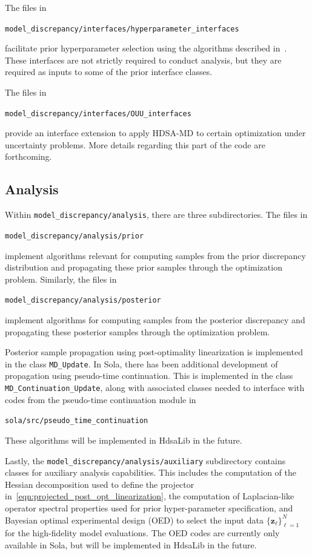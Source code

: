 \documentclass[11pt]{article}
\newcommand{\z}{\bm{z}}
\newcommand{\0}{\bm{0}}
\begin{document}
The files in 
\begin{center}\texttt{model\_discrepancy/interfaces/hyperparameter\_interfaces}\end{center}
 facilitate prior hyperparameter selection using the algorithms described in~\cite{hart2025hdsaprior}. These interfaces are not strictly required to conduct analysis, but they are required as inputs to some of the prior interface classes.

The files in 
\begin{center}\texttt{model\_discrepancy/interfaces/OUU\_interfaces}\end{center}
 provide an interface extension to apply HDSA-MD to certain optimization under uncertainty problems. More details regarding this part of the code are forthcoming. 

\subsection*{Analysis}
Within \texttt{model\_discrepancy/analysis}, there are three subdirectories. The files in 
\begin{center}\texttt{model\_discrepancy/analysis/prior}\end{center}

implement algorithms relevant for computing samples from the prior discrepancy distribution and propagating these prior samples through the optimization problem. Similarly, the files in
\begin{center}\texttt{model\_discrepancy/analysis/posterior}\end{center}

implement algorithms for computing samples from the posterior discrepancy and propagating these posterior samples through the optimization problem. 

Posterior sample propagation using post-optimality linearization is implemented in the class \texttt{MD\_Update}. In Sola, there has been additional development of propagation using pseudo-time continuation. This is implemented in the class \texttt{MD\_Continuation\_Update}, along with associated classes needed to interface with codes from the pseudo-time continuation module in 
\begin{center}\texttt{sola/src/pseudo\_time\_continuation}\end{center}

These algorithms will be implemented in HdsaLib in the future.

Lastly, the \texttt{model\_discrepancy/analysis/auxiliary} subdirectory contains classes for auxiliary analysis capabilities. This includes the computation of the Hessian decomposition used to define the projector in~\eqref{eqn:projected_post_opt_linearization}, the computation of Laplacian-like operator spectral properties used for prior hyper-parameter specification, and Bayesian optimal experimental design (OED) to select the input data $\{ \z_\ell \}_{\ell=1}^N$ for the high-fidelity model evaluations. The OED codes are currently only available in Sola, but will be implemented in HdsaLib in the future.
\end{document}
